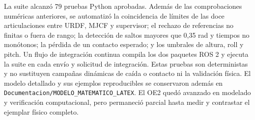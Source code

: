 La suite alcanzó 79 pruebas Python aprobadas. Además de las comprobaciones
numéricas anteriores, se automatizó la coincidencia de límites de las doce
articulaciones entre URDF, MJCF y supervisor; el rechazo de referencias no
finitas o fuera de rango; la detección de saltos mayores que 0,35 rad y tiempos
no monótonos; la pérdida de un contacto esperado; y los umbrales de altura,
roll y pitch. Un flujo de integración continua compila los dos paquetes ROS 2
y ejecuta la suite en cada envío y solicitud de integración. Estas pruebas son
deterministas y no sustituyen campañas dinámicas de caída o contacto ni la
validación física. El modelo detallado y sus ejemplos reproducibles se
conservaron además en \texttt{Documentacion/MODELO\_MATEMATICO\_LATEX}. El OE2
quedó avanzado en modelado y verificación computacional, pero permaneció
parcial hasta medir y contrastar el ejemplar físico completo.
